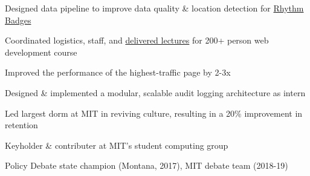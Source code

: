

\descript{}\hfill \location{}
\begin{tighteremize}
    \item {} Designed data pipeline to improve data quality \& location detection for \href{https://dspace.mit.edu/bitstream/handle/1721.1/134977/Rhythm\%202.pdf?sequence=2&isAllowed=y}{Rhythm Badges}
    \item {} Coordinated logistics, staff, and \href{https://www.youtube.com/watch?v=vwfRskkdI5o&list=PL0xuolWUmlBoLhKue65koAoJ_jX5JM8wi&index=1}{delivered lectures} for 200+ person web development course
    \item {} Improved the performance of the highest-traffic page by 2-3x
    \item {} Designed \& implemented a modular, scalable audit logging architecture as intern
    \item {} Led largest dorm at MIT in reviving culture, resulting in a 20\% improvement in retention
    \item {} Keyholder \& contributer at MIT's student computing group
    \item {} Policy Debate state champion (Montana, 2017), MIT debate team (2018-19)
\end{tighteremize}
\sectionsep

